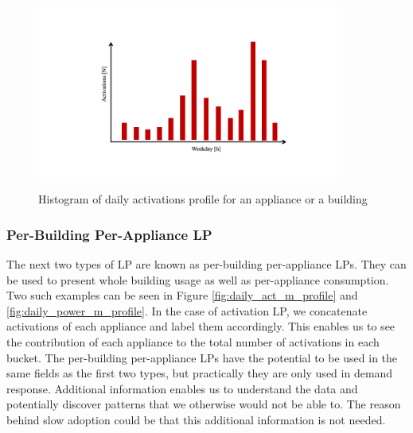 \begin{figure}[H]
	\centering
	\caption{Histogram of daily activations profile for an appliance or a building}
	\includegraphics[width=0.9\textwidth]{Figures/profile_sketches/Slide5.png}
	\label{fig:daily_act_profile}
\end{figure}

\subsubsection{Per-Building Per-Appliance LP}
The next two types of LP are known as per-building per-appliance LPs.
They can be used to present whole building usage as well as per-appliance consumption. 
Two such examples can be seen in Figure \ref{fig:daily_act_m_profile} and \ref{fig:daily_power_m_profile}.
In the case of activation LP, we concatenate activations of each appliance and label them accordingly.
This enables us to see the contribution of each appliance to the total number of activations in each bucket.
The per-building per-appliance LPs have the potential to be used in the same fields as the first two types, but practically they are only used in demand response.
Additional information enables us to understand the data and potentially discover patterns that we otherwise would not be able to.
The reason behind slow adoption could be that this additional information is not needed.

